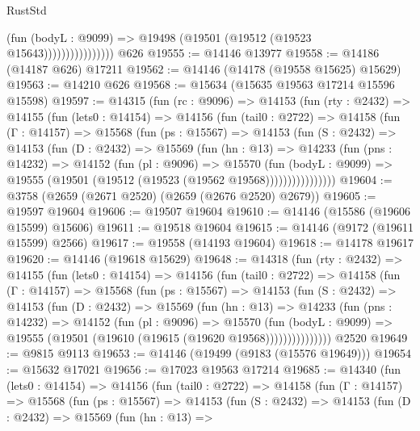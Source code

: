 \begin{lexlean}{RustStd}
\begin{coremodule}
                            (fun (bodyL : @9099) =>
                            @19498 (@19501 (@19512 (@19523 @15643))))))))))))))))
    @626
@19555 := @14146 @13977
@19558 := @14186 (@14187 @626) @17211
@19562 := @14146 (@14178 (@19558 @15625) @15629)
@19563 := @14210 @626
@19568 := @15634 (@15635 @19563 @17214 @15596 @15598)
@19597 := @14315
    (fun (rc : @9096) =>
    @14153
      (fun (rty : @2432) =>
      @14155
        (fun (lets0 : @14154) =>
        @14156
          (fun (tail0 : @2722) =>
          @14158
            (fun (Γ : @14157) =>
            @15568
              (fun (ps : @15567) =>
              @14153
                (fun (S : @2432) =>
                @14153
                  (fun (D : @2432) =>
                  @15569
                    (fun (hn : @13) =>
                    @14233
                      (fun (pns : @14232) =>
                      @14152
                        (fun (pl : @9096) =>
                        @15570
                          (fun (bodyL : @9099) =>
                          @19555 (@19501 (@19512 (@19523 (@19562 @19568))))))))))))))))
@19604 := @3758 (@2659 (@2671 @2520) (@2659 (@2676 @2520) @2679))
@19605 := @19597 @19604
@19606 := @19507 @19604
@19610 := @14146 (@15586 (@19606 @15599) @15606)
@19611 := @19518 @19604
@19615 := @14146 (@9172 (@19611 @15599) @2566)
@19617 := @19558 (@14193 @19604)
@19618 := @14178 @19617
@19620 := @14146 (@19618 @15629)
@19648 := @14318
    (fun (rty : @2432) =>
    @14155
      (fun (lets0 : @14154) =>
      @14156
        (fun (tail0 : @2722) =>
        @14158
          (fun (Γ : @14157) =>
          @15568
            (fun (ps : @15567) =>
            @14153
              (fun (S : @2432) =>
              @14153
                (fun (D : @2432) =>
                @15569
                  (fun (hn : @13) =>
                  @14233
                    (fun (pns : @14232) =>
                    @14152
                      (fun (pl : @9096) =>
                      @15570
                        (fun (bodyL : @9099) =>
                        @19555 (@19501 (@19610 (@19615 (@19620 @19568)))))))))))))))
    @2520
@19649 := @9815 @9113
@19653 := @14146 (@19499 (@9183 (@15576 @19649)))
@19654 := @15632 @17021
@19656 := @17023 @19563 @17214
@19685 := @14340
    (fun (lets0 : @14154) =>
    @14156
      (fun (tail0 : @2722) =>
      @14158
        (fun (Γ : @14157) =>
        @15568
          (fun (ps : @15567) =>
          @14153
            (fun (S : @2432) =>
            @14153
              (fun (D : @2432) =>
              @15569
                (fun (hn : @13) =>

\end{coremodule}
\end{lexlean}
